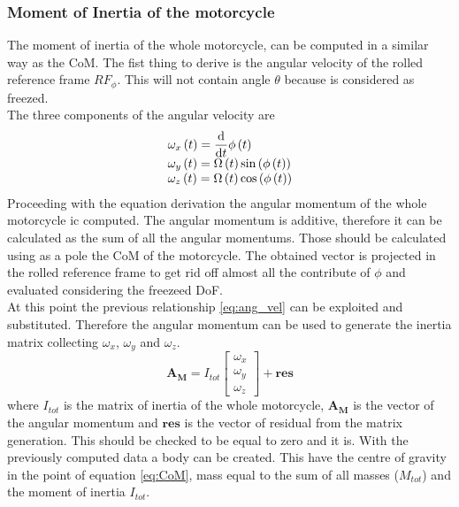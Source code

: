 \subsubsection{Moment of Inertia of the motorcycle}
%
The moment of inertia of the whole motorcycle, can be computed in a similar way as the CoM.
The fist thing to derive is the angular velocity of the rolled reference frame $RF_\phi$. This will not contain angle $\theta$ because is considered as freezed.\\
The three components of the angular velocity are 
%
\begin{equation}
\label{eq:ang_vel}
\begin{array}{l} 
\displaystyle \omega_{x} \left( t \right) ={\frac {\rm d}{
{\rm d}t}}\phi \left( t \right) \\
\displaystyle \omega_{y} \left( t \right) =\Omega \left( t \right) \sin \left( \phi \left( t
 \right)  \right) \\ 
 \displaystyle \omega_{z} \left( t \right) =\Omega \left( t \right) \cos \left( \phi \left( t \right)  \right) 
\end{array} 
\end{equation}
%
Proceeding with the equation derivation the angular momentum of the whole motorcycle ic computed. The angular momentum is additive, therefore it can be calculated as the sum of all the angular momentums. Those should be calculated using as a pole the CoM of the motorcycle. The obtained vector is projected in the rolled reference frame to get rid off almost all the contribute of 
$\phi$ and evaluated considering the freezeed DoF.\\
At this point the previous relationship \ref{eq:ang_vel} can be exploited and substituted. Therefore the angular momentum can be used to generate the inertia matrix collecting $\omega_{x}$, $\omega_{y}$ and $\omega_{z}$.
%
\begin{equation}
    \mathbf{A_M} = I_{tot} 
    \left[ 
    \begin{array}{c}
        \omega_x\\
        \omega_y\\
        \omega_z
    \end{array} 
    \right]
    + \mathbf{res}
\end{equation}
%
where $I_{tot}$ is the matrix of inertia of the whole motorcycle, $\mathbf{A_M}$ is the vector of the angular momentum and $\mathbf{res}$ is the vector of residual from the matrix generation. This should be checked to be equal to zero and it is.
With the previously computed data a body can be created. This have the centre of gravity in the point of equation \ref{eq:CoM}, mass equal to the sum of all masses ($M_{tot}$) and the moment of inertia $I_{tot}$.  
%
